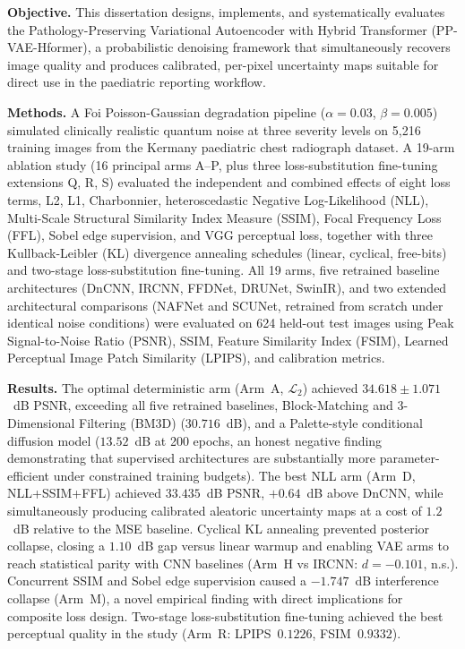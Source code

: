 \documentclass[12pt, a4paper, twoside, openright]{book}
\begin{document}
\textbf{Objective.}
This dissertation designs, implements, and systematically evaluates the Pathology-Preserving Variational Autoencoder with Hybrid Transformer (PP-VAE-Hformer), a probabilistic denoising framework that simultaneously recovers image quality and produces calibrated, per-pixel uncertainty maps suitable for direct use in the paediatric reporting workflow.

\textbf{Methods.}
A Foi Poisson-Gaussian degradation pipeline ($\alpha{=}0.03$, $\beta{=}0.005$) simulated clinically realistic quantum noise at three severity levels on 5,216 training images from the Kermany paediatric chest radiograph dataset. A 19-arm ablation study (16 principal arms A–P, plus three loss-substitution fine-tuning extensions Q, R, S) evaluated the independent and combined effects of eight loss terms, L2, L1, Charbonnier, heteroscedastic Negative Log-Likelihood (NLL), Multi-Scale Structural Similarity Index Measure (SSIM), Focal Frequency Loss (FFL), Sobel edge supervision, and VGG perceptual loss, together with three Kullback-Leibler (KL) divergence annealing schedules (linear, cyclical, free-bits) and two-stage loss-substitution fine-tuning. All 19 arms, five retrained baseline architectures (DnCNN, IRCNN, FFDNet, DRUNet, SwinIR), and two extended architectural comparisons (NAFNet and SCUNet, retrained from scratch under identical noise conditions) were evaluated on 624 held-out test images using Peak Signal-to-Noise Ratio (PSNR), SSIM, Feature Similarity Index (FSIM), Learned Perceptual Image Patch Similarity (LPIPS), and calibration metrics.

\textbf{Results.}
The optimal deterministic arm (Arm~A, $\mathcal{L}_2$) achieved $34.618 \pm 1.071$~dB PSNR, exceeding all five retrained baselines, Block-Matching and 3-Dimensional Filtering (BM3D) ($30.716$~dB), and a Palette-style conditional diffusion model ($13.52$~dB at 200 epochs, an honest negative finding demonstrating that supervised architectures are substantially more parameter-efficient under constrained training budgets). The best NLL arm (Arm~D, NLL+SSIM+FFL) achieved $33.435$~dB PSNR, $+0.64$~dB above DnCNN, while simultaneously producing calibrated aleatoric uncertainty maps at a cost of $1.2$~dB relative to the MSE baseline. Cyclical KL annealing prevented posterior collapse, closing a $1.10$~dB gap versus linear warmup and enabling VAE arms to reach statistical parity with CNN baselines (Arm~H vs IRCNN: $d{=}{-}0.101$, n.s.). Concurrent SSIM and Sobel edge supervision caused a $-1.747$~dB interference collapse (Arm~M), a novel empirical finding with direct implications for composite loss design. Two-stage loss-substitution fine-tuning achieved the best perceptual quality in the study (Arm~R: LPIPS~$0.1226$, FSIM~$0.9332$).
\end{document}
